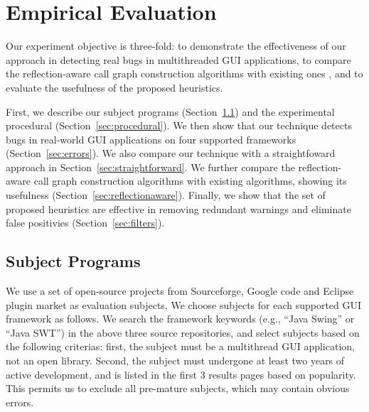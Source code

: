 \section{Empirical Evaluation}
\label{sec:evaluation}





Our experiment objective is three-fold: to demonstrate the effectiveness
of our approach in detecting real bugs in multithreaded GUI applications, to 
compare the reflection-aware call graph construction algorithms
with existing ones , and to evaluate the usefulness of the proposed 
 heuristics.  

First, we describe our subject programs (Section~\ref{sec:subjects}) and the experimental procedural (Section~\ref{sec:procedural}).
We then show that our technique detects bugs in real-world GUI applications on
four supported frameworks (Section~\ref{sec:errors}). We also compare our technique with
a straightfoward approach in Section~\ref{sec:straightforward}. We further compare the reflection-aware call graph
construction algorithms with existing algorithms, showing its usefulness (Section~\ref{sec:reflectionaware}).
 Finally, we show that the set of proposed heuristics are effective
in removing redundant warnings and eliminate false positivies (Section~\ref{sec:filters}). 



\subsection{Subject Programs}
\label{sec:subjects}

We use a set of open-source projects from Sourceforge, Google code and Eclipse plugin
market as evaluation subjects. We choose subjects for each supported GUI framework
as follows. We search the framework keywords (e.g., ``Java Swing'' or ``Java SWT'')
in the above three source repositories, and select subjects based on the following
criterias: first, the subject must be a multithread GUI application, not
an open library. Second, the subject must undergone at least two years of active development,
and is listed in the first 3 results pages based on popularity. This permits us
to exclude all pre-mature subjects, which may contain obvious errors.

